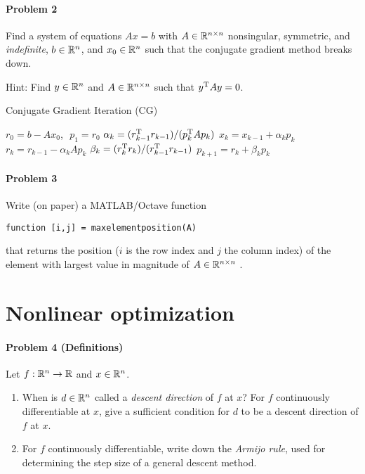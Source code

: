 \paragraph{Problem 2}
Find a system of equations $Ax=b$ with $A\in\mathbb{R}^{n\times n}$ nonsingular,
symmetric, and \emph{indefinite}, $b\in\mathbb{R}^n$, and $x_0\in\mathbb{R}^n$ such that the
conjugate gradient method breaks down.

Hint: Find $y\in\mathbb{R}^n$ and $A\in\mathbb{R}^{n\times n}$ such that $y^{\text{\upshape T}} Ay=0$.

\begin{algorithm}{Conjugate Gradient Iteration (CG)}\label{A:CG}\rm
\begin{algorithmic}[1]
\State
    $r_0 = b-Ax_0$,\,\, $p_1=r_0$
\State
    $\alpha_k = (r_{k-1}^{\text{\upshape T}} r_{k-1})/(p^{\text{\upshape T}}_{k}Ap_{k})$
\State
    $x_k=x_{k-1} + \alpha_kp_{k}$
\State
    $r_k=r_{k-1} - \alpha_kAp_{k}$
\State
    $\beta_k= (r_{k}^{\text{\upshape T}} r_{k})/(r_{k-1}^{\text{\upshape T}} r_{k-1})$
\State
    $p_{k+1}= r_{k}+\beta_kp_{k}$
\EndFor
\end{algorithmic}
\end{algorithm}
\paragraph{Problem 3}
Write (on paper) a MATLAB/Octave function
\begin{center}
  \verb!function [i,j] = maxelementposition(A)!
\end{center}
that returns the position ($i$ is the row index and $j$ the column index) of
the element with largest value in magnitude of $A\in\mathbb{R}^{n\times n}$ .
\section*{Nonlinear optimization}
\paragraph{Problem 4 (Definitions)}
Let $f:\mathbb{R}^n\to\mathbb{R}$ and $x\in\mathbb{R}^n$.
\begin{enumerate}
  \item When is $d\in\mathbb{R}^n$ called a \emph{descent direction} of $f$ at $x$? For
    $f$ continuously differentiable at $x$, give a sufficient condition for
    $d$ to be a descent direction of $f$ at $x$.

  \item For $f$ continuously differentiable, write down the \emph{Armijo
    rule}, used for determining the step size of a general descent method.
\end{enumerate}
